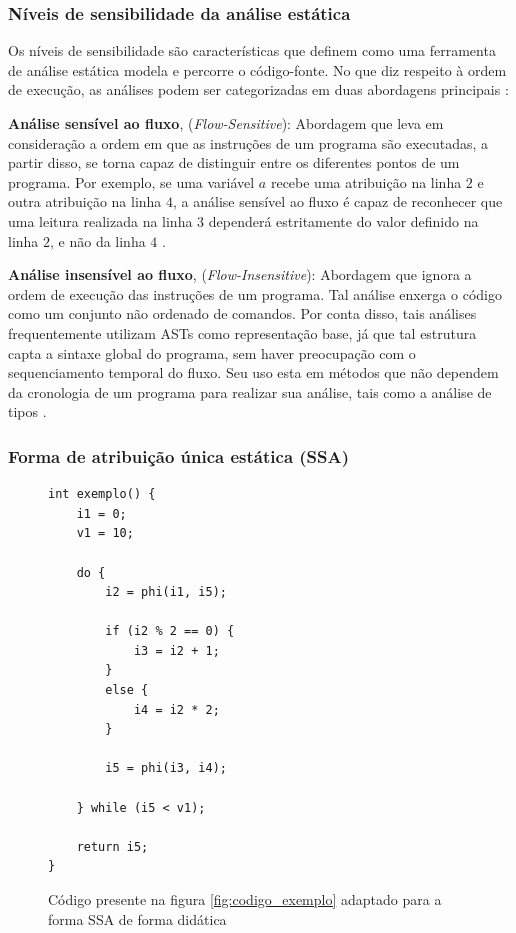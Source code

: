 \documentclass[
    12pt,                %
    openright,           %
    oneside,             %
    a4paper,             %
    english,             %
    brazil               %
]{abntex2}
\begin{document}
\subsubsection{Níveis de sensibilidade da análise estática}

Os níveis de sensibilidade são características que definem como uma ferramenta de análise estática modela e percorre o código-fonte. No que diz respeito à ordem de execução, as análises podem ser categorizadas em duas abordagens principais \cite{spa}:

\par
\textbf{Análise sensível ao fluxo}, (\textit{Flow-Sensitive}): Abordagem que leva em consideração a ordem em que as instruções de um programa são executadas, a partir disso, se torna capaz de distinguir entre os diferentes pontos de um programa. 
Por exemplo, se uma variável $a$ recebe uma atribuição na linha $2$ e outra atribuição na linha $4$, a análise sensível ao fluxo é capaz de reconhecer que uma leitura realizada na linha $3$ dependerá estritamente do valor definido na linha $2$, e não da linha $4$ \cite{spa}.

\par
\textbf{Análise insensível ao fluxo}, (\textit{Flow-Insensitive}): Abordagem que ignora a ordem de execução das instruções de um programa. Tal análise enxerga o código como um conjunto não ordenado de comandos. Por conta disso, tais análises frequentemente utilizam ASTs como representação base, 
já que tal estrutura capta a sintaxe global do programa, sem haver preocupação com o sequenciamento temporal do fluxo. Seu uso esta em métodos que não dependem da cronologia de um programa para realizar sua análise, tais como a análise de tipos \cite{spa}.


\subsubsection{Forma de atribuição única estática (SSA)}

\begin{figure}[htpb]
\centering
\caption{Código presente na figura \ref{fig:codigo_exemplo} adaptado para a forma SSA de forma didática}
\label{fig:codigo_ssa}
\begin{verbatim}
int exemplo() {
    i1 = 0;
    v1 = 10;

    do {
        i2 = phi(i1, i5); 

        if (i2 % 2 == 0) {
            i3 = i2 + 1;
        } 
        else {
            i4 = i2 * 2;
        }

        i5 = phi(i3, i4);

    } while (i5 < v1);

    return i5;
}
\end{verbatim}
\end{figure}
\end{document}
